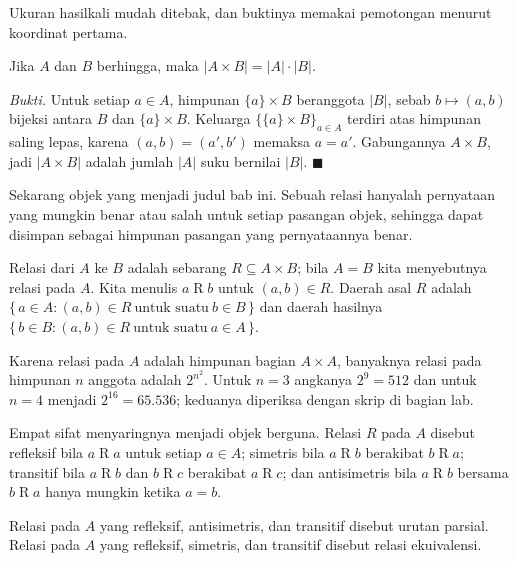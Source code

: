 Ukuran hasilkali mudah ditebak, dan buktinya memakai pemotongan menurut koordinat
pertama.

\begin{proposisi}
Jika $A$ dan $B$ berhingga, maka $|A \times B| = |A| \cdot |B|$.
\end{proposisi}
\par\smallskip\noindent\textit{Bukti.} Untuk setiap $a \in A$, himpunan
$\{a\} \times B$ beranggota $|B|$, sebab $b \mapsto (a,b)$ bijeksi antara $B$ dan
$\{a\} \times B$. Keluarga $\{\{a\} \times B\}_{a \in A}$ terdiri atas himpunan
saling lepas, karena $(a,b) = (a',b')$ memaksa $a = a'$. Gabungannya $A \times B$,
jadi $|A \times B|$ adalah jumlah $|A|$ suku bernilai $|B|$.
\hfill$\blacksquare${\parfillskip=0pt\par}

Sekarang objek yang menjadi judul bab ini. Sebuah relasi hanyalah pernyataan yang
mungkin benar atau salah untuk setiap pasangan objek, sehingga dapat disimpan sebagai
himpunan pasangan yang pernyataannya benar.

\begin{definisi}[Relasi]
Relasi dari $A$ ke $B$ adalah sebarang $R \subseteq A \times B$; bila $A = B$ kita
menyebutnya relasi pada $A$. Kita menulis $a \mathrel{R} b$ untuk $(a,b) \in R$.
Daerah asal $R$ adalah $\{\, a \in A : (a,b) \in R\ \text{untuk suatu}\ b \in B \,\}$
dan daerah hasilnya $\{\, b \in B : (a,b) \in R\ \text{untuk suatu}\ a \in A \,\}$.
\end{definisi}

Karena relasi pada $A$ adalah himpunan bagian $A \times A$, banyaknya relasi pada
himpunan $n$ anggota adalah $2^{n^{2}}$. Untuk $n = 3$ angkanya $2^{9} = 512$ dan
untuk $n = 4$ menjadi $2^{16} = 65.536$; keduanya diperiksa dengan skrip di bagian
lab.

Empat sifat menyaringnya menjadi objek berguna. Relasi $R$ pada $A$ disebut refleksif
bila $a \mathrel{R} a$ untuk setiap $a \in A$; simetris bila $a \mathrel{R} b$
berakibat $b \mathrel{R} a$; transitif bila $a \mathrel{R} b$ dan $b \mathrel{R} c$
berakibat $a \mathrel{R} c$; dan antisimetris bila $a \mathrel{R} b$ bersama
$b \mathrel{R} a$ hanya mungkin ketika $a = b$.

\begin{definisi}
Relasi pada $A$ yang refleksif, antisimetris, dan transitif disebut urutan parsial.
Relasi pada $A$ yang refleksif, simetris, dan transitif disebut relasi ekuivalensi.
\end{definisi}

